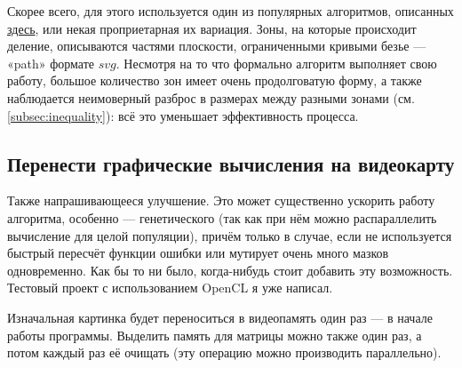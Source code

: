 Скорее всего, для этого используется один из популярных алгоритмов, описанных \href{https://en.wikipedia.org/wiki/Color_quantization}{здесь}, или некая проприетарная их вариация.
Зоны, на которые происходит деление, описываются частями плоскости, ограниченными кривыми безье — «path»  формате $svg$.
Несмотря на то что формально алгоритм выполняет свою работу, большое количество зон имеет очень продолговатую форму,
а также наблюдается неимоверный разброс в размерах между разными зонами (см. \ref{subsec:inequality}):
всё это уменьшает эффективность процесса.


\subsection{Перенести графические вычисления на видеокарту}\label{subsec:move_graphics_to_videocard}
Также напрашивающееся улучшение.
Это может существенно ускорить работу алгоритма, особенно — генетического (так как при нём можно распараллелить вычисление для целой популяции),
причём только в случае, если не используется быстрый пересчёт функции ошибки или мутирует очень много мазков одновременно.
Как бы то ни было, когда-нибудь стоит добавить эту возможность.
Тестовый проект с использованием OpenCL я уже написал.

Изначальная картинка будет переноситься в видеопамять один раз — в начале работы программы.
Выделить память для матрицы можно также один раз, а потом каждый раз её очищать (эту операцию можно производить параллельно).

